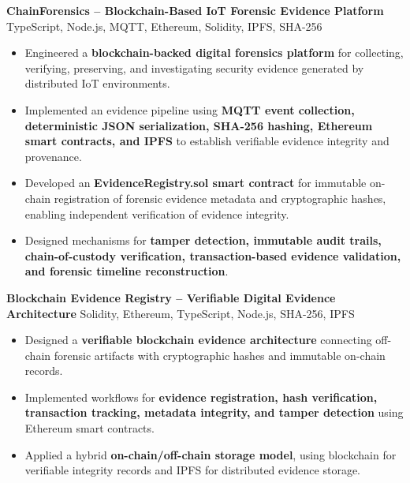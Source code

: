 \documentclass[a4paper,11pt]{article}
\newcommand{\resumeItem}[1]{
    \item \small{#1 \vspace{-2pt}}
}
\newcommand{\resumeProject}[2]{
    \vspace{2pt}
    \textbf{#1} \hfill {\small #2}
    \vspace{2pt}
}
\begin{document}
\resumeProject
{ChainForensics -- Blockchain-Based IoT Forensic Evidence Platform}
{TypeScript, Node.js, MQTT, Ethereum, Solidity, IPFS, SHA-256}

\begin{itemize}[leftmargin=*]

\resumeItem{Engineered a \textbf{blockchain-backed digital forensics platform} for collecting, verifying, preserving, and investigating security evidence generated by distributed IoT environments.}

\resumeItem{Implemented an evidence pipeline using \textbf{MQTT event collection, deterministic JSON serialization, SHA-256 hashing, Ethereum smart contracts, and IPFS} to establish verifiable evidence integrity and provenance.}

\resumeItem{Developed an \textbf{EvidenceRegistry.sol smart contract} for immutable on-chain registration of forensic evidence metadata and cryptographic hashes, enabling independent verification of evidence integrity.}

\resumeItem{Designed mechanisms for \textbf{tamper detection, immutable audit trails, chain-of-custody verification, transaction-based evidence validation, and forensic timeline reconstruction}.}

\end{itemize}

\vspace{1mm}

\resumeProject
{Blockchain Evidence Registry -- Verifiable Digital Evidence Architecture}
{Solidity, Ethereum, TypeScript, Node.js, SHA-256, IPFS}

\begin{itemize}[leftmargin=*]

\resumeItem{Designed a \textbf{verifiable blockchain evidence architecture} connecting off-chain forensic artifacts with cryptographic hashes and immutable on-chain records.}

\resumeItem{Implemented workflows for \textbf{evidence registration, hash verification, transaction tracking, metadata integrity, and tamper detection} using Ethereum smart contracts.}

\resumeItem{Applied a hybrid \textbf{on-chain/off-chain storage model}, using blockchain for verifiable integrity records and IPFS for distributed evidence storage.}

\end{itemize}

\vspace{1mm}
\end{document}
